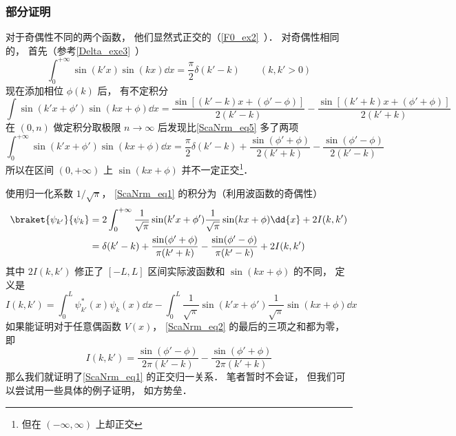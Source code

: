 \subsubsection{部分证明}
对于奇偶性不同的两个函数， 他们显然式正交的（\autoref{F0_ex2}~）． 对奇偶性相同的， 首先（参考\autoref{Delta_exe3}~）
\begin{equation}\label{ScaNrm_eq5}
\int_{0}^{+\infty} \sin(k'x)\sin(kx)\dd{x} = \frac{\pi}{2}\delta(k'-k)
\qquad (k, k' > 0)
\end{equation}
现在添加相位 $\phi(k)$ 后， 有不定积分
\begin{equation}
\int \sin(k'x+\phi')\sin(kx+\phi) \dd{x} = \frac{\sin[(k'-k)x + (\phi'-\phi)]}{2(k'-k)}
- \frac{\sin[(k'+k)x+(\phi'+\phi)]}{2(k'+k)}
\end{equation}
在 $(0,n)$ 做定积分取极限 $n\to\infty$ 后发现比\autoref{ScaNrm_eq5} 多了两项
\begin{equation}
\int_{0}^{+\infty} \sin(k'x+\phi')\sin(kx+\phi) \dd{x} = \frac{\pi}{2}\delta(k'-k)
+ \frac{\sin(\phi'+\phi)}{2(k'+k)} - \frac{\sin(\phi'-\phi)}{2(k'-k)}
\end{equation}
所以在区间 $(0, +\infty)$ 上 $\sin(kx+\phi)$ 并不一定正交\footnote{但在 $(-\infty,\infty)$ 上却正交}．

使用归一化系数 $1/\sqrt{\pi}$， \autoref{ScaNrm_eq1} 的积分为（利用波函数的奇偶性）
\begin{equation}\label{ScaNrm_eq2}
\begin{aligned}
\braket{\psi_{k'}}{\psi_k} &= 2\int_{0}^{+\infty} \frac{1}{\sqrt{\pi}}\sin(k'x+\phi')\frac{1}{\sqrt{\pi}}\sin(kx+\phi) \dd{x} + 2I(k,k')\\
&= \delta(k'-k) + \frac{\sin(\phi'+\phi)}{\pi(k'+k)} - \frac{\sin(\phi'-\phi)}{\pi(k'-k)} + 2I(k,k')
\end{aligned}
\end{equation}
其中 $2I(k,k')$ 修正了 $[-L,L]$ 区间实际波函数和 $\sin(kx+\phi)$ 的不同， 定义是
\begin{equation}\label{ScaNrm_eq8}
I(k,k') = \int_0^L \psi_{k'}^*(x) \psi_k(x) \dd{x}
-\int_{0}^{L} \frac{1}{\sqrt{\pi}}\sin(k'x+\phi') \frac{1}{\sqrt{\pi}}\sin(kx+\phi) \dd{x}
\end{equation}
如果能证明对于任意偶函数 $V(x)$， \autoref{ScaNrm_eq2} 的最后的三项之和都为零， 即
\begin{equation}
I(k,k') = \frac{\sin(\phi'-\phi)}{2\pi(k'-k)} - \frac{\sin(\phi'+\phi)}{2\pi(k'+k)}
\end{equation}
那么我们就证明了\autoref{ScaNrm_eq1} 的正交归一关系． 笔者暂时不会证， 但我们可以尝试用一些具体的例子证明， 如方势垒．

